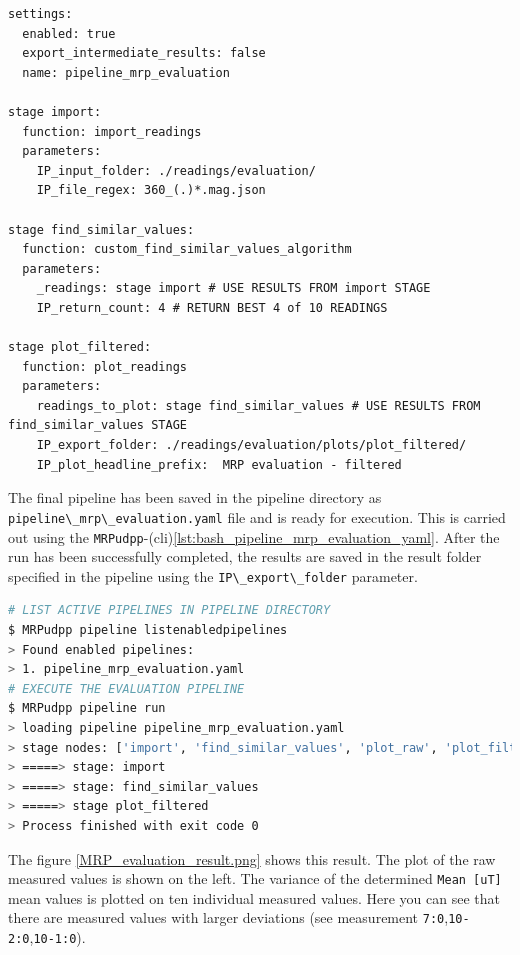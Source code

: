 \begin{lstlisting}[caption={User defined processing pipeline using custom implemented filter algorithm}, label=lst:pipeline_mrp_evaluation_yaml]
settings:
  enabled: true
  export_intermediate_results: false
  name: pipeline_mrp_evaluation

stage import:
  function: import_readings
  parameters:
    IP_input_folder: ./readings/evaluation/
    IP_file_regex: 360_(.)*.mag.json

stage find_similar_values:
  function: custom_find_similar_values_algorithm
  parameters:
    _readings: stage import # USE RESULTS FROM import STAGE
    IP_return_count: 4 # RETURN BEST 4 of 10 READINGS

stage plot_filtered:
  function: plot_readings
  parameters:
    readings_to_plot: stage find_similar_values # USE RESULTS FROM find_similar_values STAGE
    IP_export_folder: ./readings/evaluation/plots/plot_filtered/
    IP_plot_headline_prefix:  MRP evaluation - filtered
\end{lstlisting}

The final pipeline has been saved in the pipeline directory as
\passthrough{\lstinline!pipeline\_mrp\_evaluation.yaml!} file and is
ready for execution. This is carried out using the
\passthrough{\lstinline!MRPudpp!}-(cli)\ref{lst:bash_pipeline_mrp_evaluation_yaml}.
After the run has been successfully completed, the results are saved in
the result folder specified in the pipeline using the
\passthrough{\lstinline!IP\_export\_folder!} parameter.

\begin{lstlisting}[language=bash, caption={Bash result log of evaluation pipeline run}, label=lst:bash_pipeline_mrp_evaluation_yaml]
# LIST ACTIVE PIPELINES IN PIPELINE DIRECTORY 
$ MRPudpp pipeline listenabledpipelines
> Found enabled pipelines:
> 1. pipeline_mrp_evaluation.yaml
# EXECUTE THE EVALUATION PIPELINE
$ MRPudpp pipeline run
> loading pipeline pipeline_mrp_evaluation.yaml
> stage nodes: ['import', 'find_similar_values', 'plot_raw', 'plot_filtered']
> =====> stage: import 
> =====> stage: find_similar_values 
> =====> stage plot_filtered 
> Process finished with exit code 0
\end{lstlisting}

The figure \ref{MRP_evaluation_result.png} shows this result. The plot
of the raw measured values is shown on the left. The variance of the
determined \passthrough{\lstinline!Mean [uT]!} mean values is plotted on
ten individual measured values. Here you can see that there are measured
values with larger deviations (see measurement
\passthrough{\lstinline!7:0!},\passthrough{\lstinline!10-2:0!},\passthrough{\lstinline!10-1:0!}).

